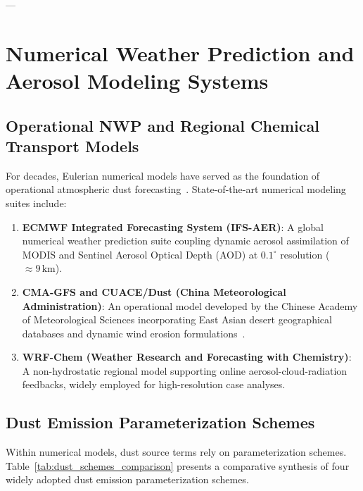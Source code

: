 ---

\section{Numerical Weather Prediction and Aerosol Modeling Systems}
\label{sec:nwp_modeling_review}

\subsection{Operational NWP and Regional Chemical Transport Models}
\label{subsec:nwp_systems}

For decades, Eulerian numerical models have served as the foundation of operational atmospheric dust forecasting~\cite{ref2}. State-of-the-art numerical modeling suites include:
\begin{enumerate}
    \item \textbf{ECMWF Integrated Forecasting System (IFS-AER)}: A global numerical weather prediction suite coupling dynamic aerosol assimilation of MODIS and Sentinel Aerosol Optical Depth (AOD) at $0.1^\circ$ resolution ($\approx 9\,\text{km}$).
    \item \textbf{CMA-GFS and CUACE/Dust (China Meteorological Administration)}: An operational model developed by the Chinese Academy of Meteorological Sciences incorporating East Asian desert geographical databases and dynamic wind erosion formulations~\cite{ref2,zhang2004evolution}.
    \item \textbf{WRF-Chem (Weather Research and Forecasting with Chemistry)}: A non-hydrostatic regional model supporting online aerosol-cloud-radiation feedbacks, widely employed for high-resolution case analyses.
\end{enumerate}

\subsection{Dust Emission Parameterization Schemes}
\label{subsec:emission_schemes}

Within numerical models, dust source terms rely on parameterization schemes. Table~\ref{tab:dust_schemes_comparison} presents a comparative synthesis of four widely adopted dust emission parameterization schemes.

